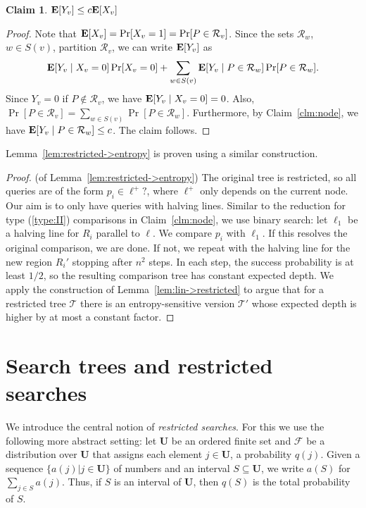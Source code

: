 \documentclass[letterpaper,11pt]{article}
\newtheorem{claim}[theorem]{Claim}
\newcommand{\EX}{\hbox{\bf E}}
\newcommand{\bU}{\textbf{U}}
\newcommand{\cR}{\mathcal{R}}
\newcommand{\cF}{\mathcal{F}}
\newcommand{\cT}{\mathcal{T}}
\begin{document}
\begin{claim}\label{clm:YvBound} 
  $\EX[Y_v] \leq c\EX[X_v]$
\end{claim}

\begin{proof}
Note that 
$\EX[X_v] = \Pr[X_v = 1] = \Pr[P \in \cR_v]$.
Since the sets $\cR_w$, $w \in S(v)$, 
partition $\cR_v$, 
we can write $\EX[Y_v]$ as
\[
  \EX[Y_v \mid X_v = 0]\Pr[X_v = 0] +
  \sum_{w \in S(v)} \EX[Y_v \mid P \in \cR_w]\Pr[P \in \cR_w].
\]
Since $Y_v = 0$ if $P \notin \cR_v$, 
we have $\EX[Y_v \mid X_v = 0] = 0$. 
Also, $\Pr[P \in \cR_v] = 
\sum_{w \in S(v)} \Pr[P \in \cR_w]$. 
Furthermore, by Claim~\ref{clm:node}, 
we have $\EX[Y_v \mid P \in \cR_w] \leq c$.
The claim follows.
\end{proof}

Lemma~\ref{lem:restricted->entropy} is proven using a similar construction.

\begin{proof} (of Lemma~\ref{lem:restricted->entropy}) The original tree is
restricted, so all queries are of the form $p_i \in \ell^+?$, where $\ell^+$
only depends on the current node. Our aim is to only have queries with halving lines.
Similar to the 
reduction for type (\ref{type:II}) 
comparisons in Claim~\ref{clm:node}, 
we use binary search: 
let $\ell_1$ be a halving line
for $R_i$ parallel to $\ell$. We 
compare $p_i$ with $\ell_1$. If 
this resolves the original comparison, 	
we are done. If not, we 
repeat with the halving 
line for the new region $R_i'$
stopping after $n^2$ steps. 
In each step, the success probability
is at least $1/2$, so the resulting 
comparison tree has constant expected 
depth. We apply the construction
of Lemma~\ref{lem:lin->restricted} 
to argue that for a restricted 
tree $\cT$ there is an entropy-sensitive 
version $\cT'$ whose
expected depth is higher by at 
most a constant factor.
\end{proof}


\section{Search trees and restricted searches} \label{sec:rest}

We introduce the central notion of 
\emph{restricted searches}. For this
we use the following more abstract setting:
let $\bU$ be an ordered finite set 
and $\cF$ be a distribution over $\bU$ 
that assigns each element $j \in \bU$, 
a probability $q(j)$.
Given a sequence $\{a(j) | {j \in \bU}\}$ of numbers 
and an interval $S \subseteq \bU$, we write $a(S)$ 
for $\sum_{j \in S} a(j)$.
Thus, if $S$ is an interval of $\bU$, 
then $q(S)$ is the total probability of $S$.
\end{document}
